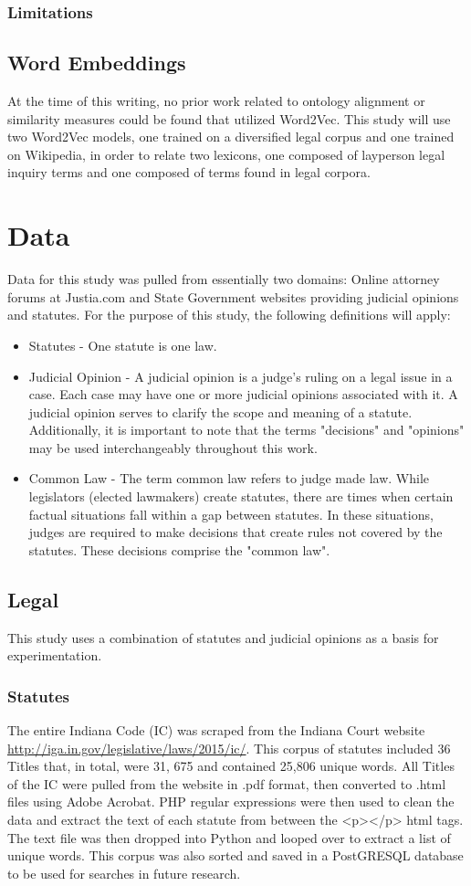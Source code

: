 \documentclass[11pt]{article}
\begin{document}
\subsubsection{Limitations}
\subsection{Word Embeddings}  
At the time of this writing, no prior work related to ontology alignment or similarity measures could be found that utilized Word2Vec.  This study will use two Word2Vec models, one trained on a diversified legal corpus and one trained on Wikipedia, in order to relate two lexicons, one composed of layperson legal inquiry terms and one composed of terms found in legal corpora. 

\section{Data}
Data for this study was pulled from essentially two domains:  Online attorney forums at Justia.com and State Government websites providing judicial opinions and statutes.  For the purpose of this study, the following definitions will apply:
\begin{itemize}
\item Statutes - One statute is one law.  
\item Judicial Opinion - A judicial opinion is a judge's ruling on a legal issue in a case.  Each case may have one or more judicial opinions associated with it.  A judicial opinion serves to clarify the scope and meaning of a statute.  Additionally, it is important to note that the terms "decisions" and "opinions" may be used interchangeably throughout this work.
\item Common Law - The term common law refers to judge made law.  While legislators (elected lawmakers) create statutes, there are times when certain factual situations fall within a gap between statutes.  In these situations, judges are required to make decisions that create rules not covered by the statutes.  These decisions comprise the "common law".    
\end{itemize}
\subsection{Legal}
This study uses a combination of statutes and judicial opinions as a basis for experimentation.
\subsubsection{Statutes}
The entire Indiana Code (IC) was scraped from the Indiana Court website \url{http://iga.in.gov/legislative/laws/2015/ic/}.  This corpus of statutes included 36 Titles that, in total, were 31, 675 and contained 25,806 unique words.  All Titles of the IC were pulled from the website in .pdf format, then converted to .html files using Adobe Acrobat.  PHP regular expressions were then used to clean the data and extract the text of each statute from between the <p></p> html tags.  The text file was then dropped into Python and looped over to extract a list of unique words.  This corpus was also sorted and saved in a PostGRESQL database to be used for searches in future research.  
\end{document}
